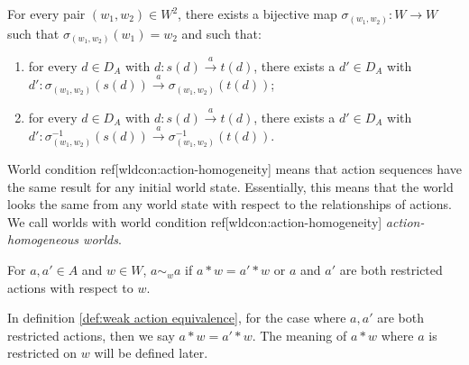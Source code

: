 
\begin{world_condition}\label{wldcon:action-homogeneity}
	For every pair $(w_{1}, w_{2}) \in W^{2}$, there exists a bijective map $\sigma_{(w_{1},w_{2})}: W \to W$ such that $\sigma_{(w_{1},w_{2})}(w_{1})=w_{2}$ and such that:

	\begin{enumerate}
		\item for every $d \in D_{A}$ with $d: s(d) \xrightarrow{a} t(d)$, there exists a $d' \in D_{A}$ with $d': \sigma_{(w_{1}, w_{2})}(s(d)) \xrightarrow{a} \sigma_{(w_{1}, w_{2})}(t(d))$;

		\item for every $d \in D_{A}$ with $d: s(d) \xrightarrow{a} t(d)$, there exists a $d' \in D_{A}$ with $d': \sigma^{-1}_{(w_{1}, w_{2})}(s(d)) \xrightarrow{a} \sigma^{-1}_{(w_{1}, w_{2})}(t(d))$.
	\end{enumerate}
\end{world_condition}

World condition ref[wldcon:action-homogeneity] means that action sequences have the same result for any initial world state.
Essentially, this means that the world looks the same from any world state with respect to the relationships of actions.
We call worlds with world condition ref[wldcon:action-homogeneity] \textit{action-homogeneous worlds}.

\begin{definition}\label{def:weak action equivalence}
	For $a,a' \in A$ and $w \in W$, $a \sim_{w} a$ if $a * w = a' * w$ or $a$ and $a'$ are both restricted actions with respect to $w$.
\end{definition}

\begin{remark}
	In definition \ref{def:weak action equivalence}, for the case where $a, a'$ are both restricted actions, then we say $a * w = a' * w$.
	The meaning of $a * w$ where $a$ is restricted on $w$ will be defined later.
\end{remark}

